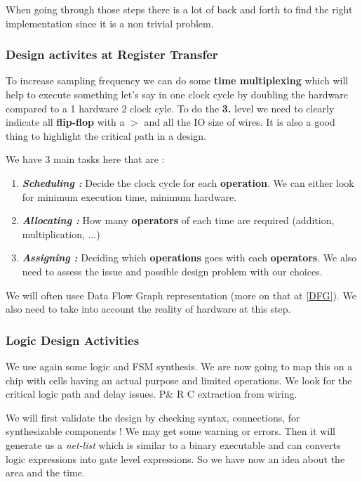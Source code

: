 \documentclass{report}
\begin{document}
When going through those steps there is a lot of back and forth to find the right implementation since it is a non trivial problem.

\subsubsection{Design activites at Register Transfer}

To increase sampling frequency we can do some \textbf{time multiplexing} which will help to execute something let's say in one clock cycle by doubling the hardware compared to a 1 hardware 2 clock cyle. To do the \textbf{3.} level we need to clearly indicate all \textbf{flip-flop} with a $>$ and all the IO size of wires. It is also a good thing to highlight the critical path in a design.

We have 3 main tasks here that are :
\begin{enumerate}
    \item \textit{\textbf{Scheduling :}} Decide the clock cycle for each \textbf{operation}. We can either look for minimum execution time, minimum hardware.
    \item \textit{\textbf{Allocating :}} How many \textbf{operators} of each time are required (addition, multiplication, ...)
    \item \textit{\textbf{Assigning :}} Deciding which \textbf{operations} goes with each \textbf{operators}. We also need to assess the issue and possible design problem with our choices.
\end{enumerate}

We will often usee Data Flow Graph representation (more on that at \ref{DFG}). We also need to take into account the reality of hardware at this step.

\subsubsection{Logic Design Activities}

We use again some logic and FSM synthesis. We are now going to map this on a chip with cells having an actual purpose and limited operations. We look for the critical logic path and delay issues. P\& R C extraction from wiring.

We will first validate the design by checking syntax, connections, for synthesizable components ! We may get some warning or errors. Then it will generate us a \textit{net-list} which is similar to a binary executable and can converts logic expressions into gate level expressions. So we have now an idea about the area and the time.
\end{document}
